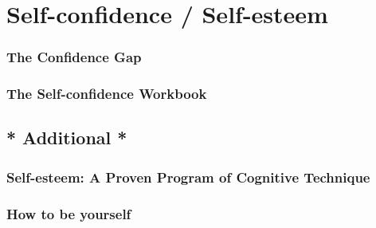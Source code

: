 \documentclass[12pt, a4paper]{article}
\newcommand{\nl}{\vspace{\baselineskip}}
\begin{document}
\section*{Self-confidence / Self-esteem}
\subsubsection*{The Confidence Gap}
\subsubsection*{The Self-confidence Workbook}\nl

\subsection*{* Additional *}
\subsubsection*{Self-esteem: A Proven Program of Cognitive Technique}
\subsubsection*{How to be yourself}\nl
\end{document}
